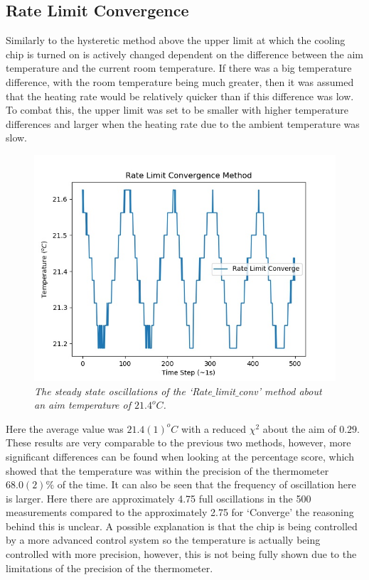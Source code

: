 \documentclass[10pt]{article}
\begin{document}
\subsection*{Rate Limit Convergence}
Similarly to the hysteretic method above the upper limit at which the cooling chip is turned on is actively changed dependent on the difference between the aim temperature and the current room temperature. If there was a big temperature difference, with the room temperature being much greater, then it was assumed that the heating rate would be relatively quicker than if this difference was low. To combat this, the upper limit was set to be smaller with higher temperature differences and larger when the heating rate due to the ambient temperature was slow.\\

\begin{figure}[t]
    \centering
    \includegraphics[scale=0.75]{rate_lim.jpg}
    \caption{\it{The steady state oscillations of the `Rate$\_$limit$\_$conv' method about an aim temperature of $21.4^oC$.}}
    \label{fig:rate}
\end{figure}

Here the average value was $21.4(1)^oC$ with a reduced $\chi^2$ about the aim of $0.29$. These results are very comparable to the previous two methods, however, more significant differences can be found when looking at the percentage score, which showed that the temperature was within the precision of the thermometer $68.0(2)\%$ of the time. It can also be seen that the frequency of oscillation here is larger. Here there are approximately 4.75 full oscillations in the 500 measurements compared to the approximately 2.75 for `Converge' the reasoning behind this is unclear. A possible explanation is that the chip is being controlled by a more advanced control system so the temperature is actually being controlled with more precision, however, this is not being fully shown due to the limitations of the precision of the thermometer.\\
\newpage
\end{document}

